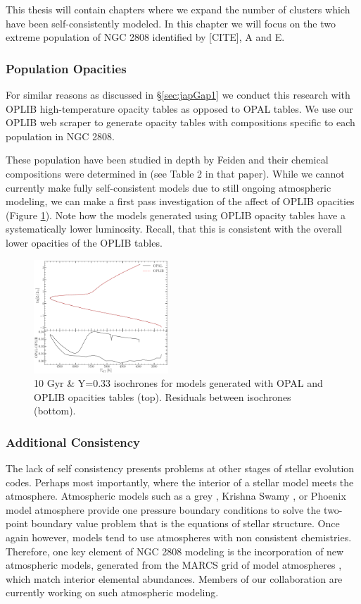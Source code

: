 This thesis will contain chapters where we expand the number of clusters which
have been self-consistently modeled. In this chapter we will focus on the two
extreme population of NGC 2808 identified by [CITE], A and E.

\subsubsection{Population Opacities}
For similar reasons as discussed in \S\ref{sec:japGap1} we conduct this research
with OPLIB high-temperature opacity tables as opposed to OPAL tables. We use
our OPLIB web scraper to generate opacity tables with compositions specific to
each population in NGC 2808.

These population have been studied in depth by Feiden and their chemical
compositions were determined in \citet{Milone2015} (see Table 2 in that paper).
While we cannot currently make fully self-consistent models due to still
ongoing atmospheric modeling, we can make a first pass investigation of the
affect of OPLIB opacities (Figure \ref{fig:NGC2808ISO}). Note how the models
generated using OPLIB opacity tables have a systematically lower luminosity.
Recall, that this is consistent with the overall lower opacities of the OPLIB
tables.

\begin{figure}
	\centering
	\includegraphics[width=0.45\textwidth]{src/Figures/033ZIsosOPALOPLIB.pdf}
	\caption{10 Gyr \& Y=0.33 isochrones for models generated with OPAL and
	OPLIB opacities tables (top). Residuals between isochrones (bottom).}
	\label{fig:NGC2808ISO}
\end{figure}

\subsubsection{Additional Consistency}
The lack of self consistency presents problems at other stages of stellar
evolution codes. Perhaps most importantly, where the interior of a stellar
model meets the atmosphere. Atmospheric models such as a grey
\citep{Eddington1916}, Krishna Swamy \citep{Krishna1966}, or Phoenix
\citep{Husser2013} model atmosphere provide one pressure boundary conditions to
solve the two-point boundary value problem that is the equations of stellar
structure. Once again however, models tend to use atmospheres with non
consistent chemistries. Therefore, one key element of NGC 2808 modeling is the
incorporation of new atmospheric models, generated from the MARCS grid of model
atmospheres \citep{Plez2008}, which match interior elemental abundances.
Members of our collaboration are currently working on such atmospheric
modeling.

